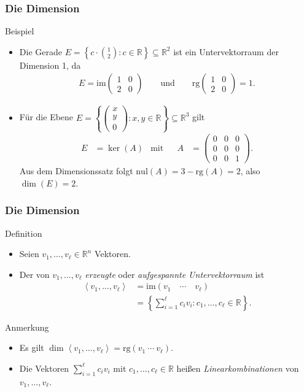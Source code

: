 \documentclass{beamer}
\renewcommand{\emph}[1]{{\textcolor{solarizedRed}{\itshape #1}}}
\newcommand\RR{\mathbb R}
\newcommand\bc[1]{\left({#1}\right)}
\newcommand\cbc[1]{\left\{{#1}\right\}}
\newcommand{\bck}[1]{\left\langle{#1}\right\rangle}
\newcommand{\ue}{\"u}
\newcommand{\im}{\mathrm{im}}
\newcommand{\nul}{\mathrm{nul}}
\newcommand{\rk}{\mathrm{rg}}
\newcommand{\mytitle}{Die Dimension}
\begin{document}
\begin{frame}\frametitle{\mytitle}
\begin{block}{Beispiel}
\begin{itemize}
	\item Die Gerade $E=\cbc{c\cdot\binom{1}2:c\in\RR}\subseteq\RR^2$ ist ein Untervektorraum der Dimension 1, da
		\begin{align*}
			E=\im\begin{pmatrix} 1&0\\2&0 \end{pmatrix}\qquad\mbox{und}\qquad\rk\begin{pmatrix} 1&0\\2&0 \end{pmatrix}=1.
		\end{align*}
	\item F\ue r die Ebene $E=\cbc{\begin{pmatrix}x\\y\\0\end{pmatrix}:x,y\in\RR}\subseteq\RR^3$ gilt
		\begin{align*}
			E&=\ker(A)&\mbox{mit}&&A&=\begin{pmatrix}0&0&0\\0&0&0\\0&0&1\end{pmatrix}.
		\end{align*}
		Aus dem Dimensionssatz folgt $\nul(A)=3-\rk(A)=2$, also $\dim(E)=2$.
\end{itemize}	
\end{block}
\end{frame}

\begin{frame}\frametitle{\mytitle}
	\begin{block}{Definition}
		\begin{itemize}
			\item Seien $v_1,\ldots,v_\ell\in\RR^n$ Vektoren.
			\item Der von $v_1,\ldots,v_\ell$ \emph{erzeugte} oder \emph{aufgespannte Untervektorraum} ist
				\begin{align*}
					\bck{v_1,\ldots,v_\ell}&=\im\bc{v_1\quad\cdots\quad v_\ell}\\
										   &=\cbc{\sum_{i=1}^\ell c_iv_i:c_1,\ldots,c_\ell\in\RR}.
				\end{align*}
		\end{itemize}
	\end{block}
	\begin{block}{Anmerkung}
	\begin{itemize}
	\item Es gilt $\dim\bck{v_1,\ldots,v_\ell}=\rk(v_1\ \cdots\ v_\ell)$.
	\item Die Vektoren $\sum_{i=1}^\ell c_iv_i$ mit $c_1,\ldots,c_\ell\in\RR$ hei\ss en \emph{Linearkombinationen} von $v_1,\ldots,v_\ell$.
	\end{itemize}
		
	\end{block}
\end{frame}
\end{document}
